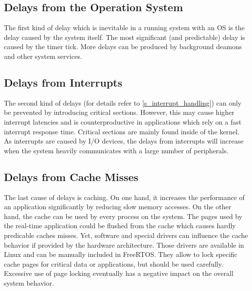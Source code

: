 \subsection{Delays from the Operation System}
The first kind of delay which is inevitable in a running system with an \ac{OS} is the delay caused by the system itself.
The most significant (and predictable) delay is caused by the timer tick.
More delays can be produced by background deamons and other system services. 

\subsection{Delays from Interrupts}
The second kind of delays (for details refer to \ref{s_interrupt_handling}) can only be prevented by introducing critical sections. 
However, this may cause higher interrupt latencies and is counterproductive in applications which rely on a fast interrupt response time.
Critical sections are mainly found inside of the kernel. 
As interrupts are caused by \ac{I/O} devices, the delays from interrupts will increase when the system heavily communicates with a large number of peripherals. 

\subsection{Delays from Cache Misses}
The last cause of delays is caching.
On one hand, it increases the performance of an application significantly by reducing slow memory accesses. 
On the other hand, the cache can be used by every process on the system.
The pages used by the real-time application could be flushed from the cache which causes hardly predicable caches misses.
Yet, software and special drivers can influence the cache behavior if provided by the hardware architecture.
Those drivers are available in Linux and can be manually included in FreeRTOS.
They allow to lock specific cache pages for critical data or applications, but should be used carefully.
Excessive use of page locking eventually has a negative impact on the overall system behavior.

